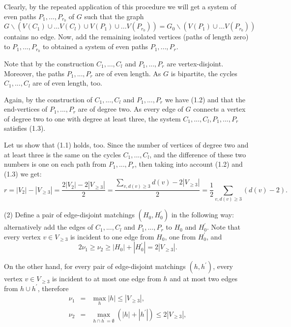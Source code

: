 \documentclass[fleqn,12pt,twoside]{article}
\newenvironment{proof}[1][Proof.]{\begin{trivlist}
\item[\hskip \labelsep {\bfseries #1}]}{\end{trivlist}}
\begin{document}
\begin{proof}
Clearly, by the repeated application of this procedure we will get a
system of even paths $P_{1},...,P_{r_{0}}$ of $G$ such that the
graph $G\backslash (V(C_{1})\cup ...V(C_{l})\cup V(P_{1})\cup
...V(P_{r_{0}}))=G_{0}\backslash (V(P_{1})\cup ...V(P_{r_{0}}))$
contains no edge. Now, add the remaining isolated vertices (paths of
length zero) to $P_{1},...,P_{r_{0}}$ to obtained a system of even
paths $P_{1},...,P_{r}$.

Note that by the construction $C_{1},...,C_{l}$ and
$P_{1},...,P_{r}$ are vertex-disjoint. Moreover, the paths
$P_{1},...,P_{r}$ are of even length. As $G$ is bipartite, the
cycles $C_{1},...,C_{l}$ are of even length, too.

Again, by the construction of $C_{1},...,C_{l}$ and
$P_{1},...,P_{r}$ we have (1.2) and that the end-vertices of
$P_{1},...,P_{r}$ are of degree two. As every edge of $G$ connects a
vertex of degree two to one with degree at least three, the system
$C_{1},...,C_{l},P_{1},...,P_{r}$ satisfies (1.3).

Let us show that (1.1) holds, too. Since the number of vertices of
degree two and at least three is the same on the cycles
$C_{1},...,C_{l}$, and the difference of these two numbers is one on
each path from $P_{1},...,P_{r}$,
then taking into account (1.2) and (1.3) we get:\begin{equation*}
r=\left\vert V_{2}\right\vert -\left\vert V_{\geq 3}\right\vert =\frac{2\left\vert V_{2}\right\vert -2\left\vert V_{\geq 3}\right\vert }{2}=\frac{\sum_{v,d(v)\geq 3}d(v)-2\left\vert V_{\geq 3}\right\vert
}{2}=\frac{1}{2}\sum_{v,d(v)\geq 3}(d(v)-2).
\end{equation*}

(2) Define a pair of edge-disjoint matchings $(H_{0},H_{0}^{\prime
})$ in
the following way: alternatively add the edges of $C_{1},...,C_{l}$ and $P_{1},...,P_{r}$ to $H_{0}$ and $H_{0}^{\prime }$. Note that every vertex $v\in V_{\geq 3}$ is incident to one edge from $H_{0}$, one from $H_{0}^{\prime }$, and\begin{equation}
2\nu _{1}\geq \nu _{2}\geq \left\vert H_{0}\right\vert +\left\vert
H_{0}^{\prime }\right\vert =2\left\vert V_{\geq 3}\right\vert .
\label{eq1}
\end{equation}

On the other hand, for every pair of edge-disjoint matchings
$(h,h^{\prime }) $, every vertex $v\in V_{\geq 3}$ is incident to at
most one edge
from $h$ and at most two edges from $h\cup h^{\prime }$, therefore\begin{eqnarray*}
\nu _{1} &=&\underset{h}{\max }\left\vert h\right\vert \leq
\left\vert
V_{\geq 3}\right\vert , \\
\nu _{2} &=&\underset{h\cap h^{\prime }=\emptyset}{\max }(\left\vert
h\right\vert +\left\vert h^{\prime }\right\vert )\leq 2\left\vert
V_{\geq 3}\right\vert ,
\end{eqnarray*}


\end{proof}
\end{document}
